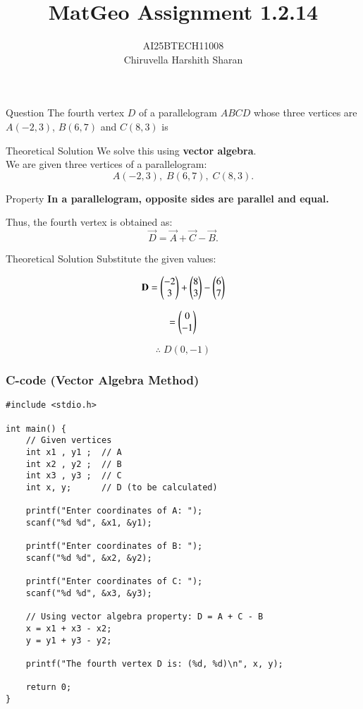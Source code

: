 \documentclass{beamer}
\title{MatGeo Assignment 1.2.14}
\author{AI25BTECH11008\\Chiruvella Harshith Sharan}
\begin{document}
\frame{\titlepage}

\begin{frame}{Question}
The fourth vertex $D$ of a parallelogram $ABCD$ whose three vertices are 
$A(-2,3)$, $B(6,7)$ and $C(8,3)$ is
\end{frame}

\begin{frame}{Theoretical Solution}
\noindent
We solve this using \textbf{vector algebra}. \\

We are given three vertices of a parallelogram:
$$A(-2,3), \; B(6,7), \; C(8,3).$$
\end{frame}

\begin{frame}{Property}
\textbf{In a parallelogram, opposite sides are parallel and equal.}  

Thus, the fourth vertex is obtained as:
\[
\vec{D} = \vec{A} + \vec{C} - \vec{B}.
\]
\end{frame}

\begin{frame}{Theoretical Solution}
Substitute the given values:  

\[
\mathbf{D} = \begin{pmatrix}-2 \\ 3\end{pmatrix} + \begin{pmatrix}8 \\ 3\end{pmatrix} - \begin{pmatrix}6 \\ 7\end{pmatrix}
\]

\[
= \begin{pmatrix}0 \\ -1\end{pmatrix}
\]

\[
\therefore \; D(0,-1)
\]
\end{frame}

\begin{frame}[fragile]
\frametitle{C-code (Vector Algebra Method)}
\begin{lstlisting}
#include <stdio.h>

int main() {
    // Given vertices
    int x1 , y1 ;  // A
    int x2 , y2 ;  // B
    int x3 , y3 ;  // C
    int x, y;      // D (to be calculated)

    printf("Enter coordinates of A: ");
    scanf("%d %d", &x1, &y1);

    printf("Enter coordinates of B: ");
    scanf("%d %d", &x2, &y2);

    printf("Enter coordinates of C: ");
    scanf("%d %d", &x3, &y3);

    // Using vector algebra property: D = A + C - B
    x = x1 + x3 - x2;
    y = y1 + y3 - y2;

    printf("The fourth vertex D is: (%d, %d)\n", x, y);

    return 0;
}
\end{lstlisting}
\end{frame}
\end{document}
